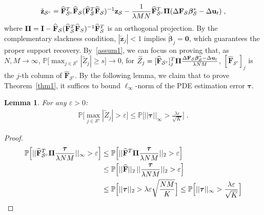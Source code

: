 \documentclass[a4paper,11pt]{article}
\newcommand{\btau}{\bm{\tau}}
\newcommand{\bbeta}{\bm{\beta}}
\newcommand{\bF}{\mathbf{F}}
\newcommand{\mS}{\mathcal{S}}
\newcommand{\bu}{\mathbf{u}}
\newtheorem{lemma}{Lemma}[section]
\begin{document}
\begin{align}
\check{\mathbf{z}}_{\mS^c}=\widehat{\bF}_{\mS^c}^T\widehat{\bF}_\mS(\widehat{\bF}_{\mS}^T\widehat{\bF}_\mS)^{-1}\mathbf{z}_\mS-\frac{1}{\lambda MN}\widehat{\bF}_{\mS^c}^T{\bf{\Pi}}(\Delta \bF_\mS\bbeta_\mS^*-\Delta \bu_t)\;,\label{zSc}
\end{align} 
where ${\bf{\Pi}}={\bf{I}}-\widehat{\bF}_\mS(\widehat{\bF}_\mS^T\widehat{\bF}_S)^{-1}\widehat{\bF}_\mS^T$ is an orthogonal projection. By the complementary slackness condition,  $|\check{\mathbf{z}}_j|< 1$ implies $\check{\bbeta}_j=\mathbf{0}$, which guarantees the proper support recovery. By~\eqref{assum1}, we can focus on proving that, as $N,M\to \infty$, $
\mathbb{P}\big[\max_{j\in \mS^c}|\widetilde{Z}_j|\geq s\big]\to 0$, for $\widetilde{Z}_j = [\widehat{\bF}_{\mS^c}]^T_j{\bf\Pi}\frac{\Delta \bF_\mS\bbeta_\mS^*-\Delta \bu_t}{\lambda NM}$, $[\widehat{\bF}_{\mS^c}]_j$ is the $j$-th column of $\widehat{\bF}_{\mS^c}$. By the following lemma, we claim that to prove Theorem~\ref{thm1}, it suffices to bound $\ell_\infty$-norm of the PDE estimation error $\btau$.
\begin{lemma}\label{Zlemma}
For any $\varepsilon>0$:
\begin{align}
\mathbb{P}\big[\max_{j\in \mS^c}|\widetilde{Z}_j|>\varepsilon\big]\leq  \mathbb{P}\Big[||\btau||_\infty>\frac{\lambda\varepsilon}{\sqrt{K}}\Big]\;.\label{ZlemmaBound}
\end{align}
\end{lemma}
\begin{proof}
	\begin{align*}
	\mathbb{P}\Big[||\widehat{\bF}_{\mS^c}^T{\bf\Pi}\frac{\btau}{\lambda NM}||_\infty>\varepsilon\Big]&\leq\mathbb{P}\Big[||\widehat{\bF}^T{\bf\Pi}\frac{\btau}{\lambda NM}||_2>\varepsilon\Big]\\
	&\leq\mathbb{P}\Big[||\widehat{\bF}||_2\,||\frac{\btau}{\lambda NM}||_2>\varepsilon\Big]\\
	&\leq \mathbb{P}\Big[||\btau||_2>\lambda \varepsilon\sqrt{\frac{NM}{K}}\Big]\leq \mathbb{P}\Big[||\btau||_\infty>\frac{\lambda\varepsilon}{\sqrt{K}}\Big]
	\end{align*}
\end{proof}
\end{document}
